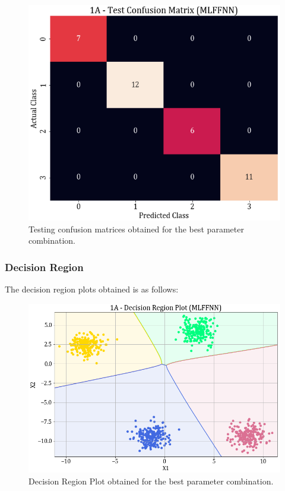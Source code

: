 \documentclass[11pt,a4paper]{article}
\begin{document}
\begin{figure}[H]
    \centering
    \includegraphics[scale=0.4]{images/1A_MLFFNN_test_confmat.png}
    \caption{Testing confusion matrices obtained for the best parameter combination.}
\end{figure}

\subsubsection{Decision Region}
The decision region plots obtained is as follows:
\begin{figure}[H]
    \centering
    \includegraphics[scale=0.6]{images/1A_MLFFNN_Decision_Plot.png}
    \caption{Decision Region Plot obtained for the best parameter combination.}
\end{figure}
\end{document}
